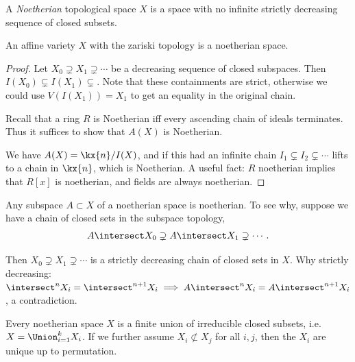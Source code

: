 \begin{definition}

A \emph{Noetherian} topological space \(X\) is a space with no infinite
strictly decreasing sequence of closed subsets.

\end{definition}

\begin{proposition}[?]

An affine variety \(X\) with the zariski topology is a noetherian space.

\end{proposition}

\begin{proof}

Let \(X_0 \supsetneq X_1 \supsetneq \cdots\) be a decreasing sequence of
closed subspaces. Then \(I(X_0) \subsetneq I(X_1) \subsetneq\). Note
that these containments are strict, otherwise we could use
\(V(I(X_1)) = X_1\) to get an equality in the original chain.

Recall that a ring \(R\) is Noetherian iff every ascending chain of
ideals terminates. Thus it suffices to show that \(A(X)\) is Noetherian.

We have \(A(X) = \kx{n} / I(X)\), and if this had an infinite chain
\(I_1 \subsetneq I_2 \subsetneq \cdots\) lifts to a chain in \(\kx{n}\),
which is Noetherian. A useful fact: \(R\) noetherian implies that
\(R[x]\) is noetherian, and fields are always noetherian.

\end{proof}

\begin{remark}

Any subspace \(A\subset X\) of a noetherian space is noetherian. To see
why, suppose we have a chain of closed sets in the subspace topology,
\begin{align*}  
A\intersect X_0 \supsetneq A\intersect X_1 \supsetneq \cdots
.\end{align*}

Then \(X_0 \supsetneq X_1 \supsetneq \cdots\) is a strictly decreasing
chain of closed sets in \(X\). Why strictly decreasing:
\(\intersect^n X_i = \intersect^{n+1} X_i \implies A\intersect^n X_i = A\intersect^{n+1} X_i\),
a contradiction.

\end{remark}

\begin{proposition}[Important]

Every noetherian space \(X\) is a finite union of irreducible closed
subsets, i.e.~\(X = \Union_{i=1}^k X_i\). If we further assume
\(X_i \not\subset X_j\) for all \(i, j\), then the \(X_i\) are unique up
to permutation.

\end{proposition}

